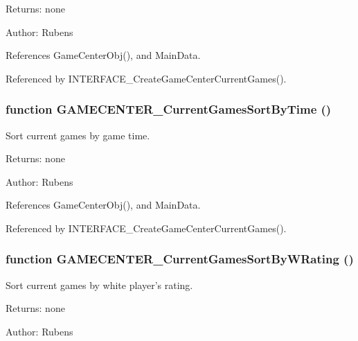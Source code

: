 \begin{Desc}
\item[Returns:]none \end{Desc}
\begin{Desc}
\item[Author:]Rubens \end{Desc}


References GameCenterObj(), and MainData.

Referenced by INTERFACE\_\-CreateGameCenterCurrentGames().
\subsubsection[GAMECENTER\_\-CurrentGamesSortByTime]{\setlength{\rightskip}{0pt plus 5cm}function GAMECENTER\_\-CurrentGamesSortByTime ()}\label{gamecenter_2gamecenter_8js_d39281573facbd1500eb75068fb4b987}


Sort current games by game time. 

\begin{Desc}
\item[Returns:]none \end{Desc}
\begin{Desc}
\item[Author:]Rubens \end{Desc}


References GameCenterObj(), and MainData.

Referenced by INTERFACE\_\-CreateGameCenterCurrentGames().
\subsubsection[GAMECENTER\_\-CurrentGamesSortByWRating]{\setlength{\rightskip}{0pt plus 5cm}function GAMECENTER\_\-CurrentGamesSortByWRating ()}\label{gamecenter_2gamecenter_8js_f1d1911b7cfe901e8f8350fdfb833f60}


Sort current games by white player's rating. 

\begin{Desc}
\item[Returns:]none \end{Desc}
\begin{Desc}
\item[Author:]Rubens \end{Desc}


